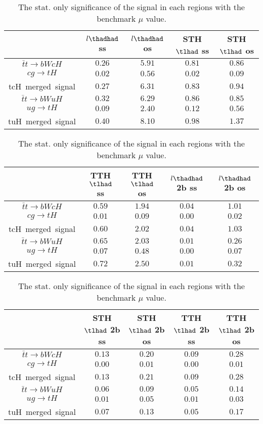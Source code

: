 \begin{table}
\footnotesize
\caption{The stat. only significance of the signal in each regions with the benchmark $\mu$ value.}
\centering
\begin{tabular}{|c|c|c|c|c|} \hline
 & $l\thadhad$ ss & $l\thadhad$ os & STH $\tlhad$ ss & STH $\tlhad$ os\\\hline
$\bar{t}t\to bWcH$ & $0.26$ & $5.91$ & $0.81$ & $0.86$\\\hline
$cg\to tH$ & $0.02$ & $0.56$ & $0.02$ & $0.09$\\\hline
tcH~merged~signal & $0.27$ & $6.31$ & $0.83$ & $0.94$\\\hline
$\bar{t}t\to bWuH$ & $0.32$ & $6.29$ & $0.86$ & $0.85$\\\hline
$ug\to tH$ & $0.09$ & $2.40$ & $0.12$ & $0.56$\\\hline
tuH~merged~signal & $0.40$ & $8.10$ & $0.98$ & $1.37$\\\hline
\end{tabular}
\begin{tabular}{|c|c|c|c|c|} \hline
 & TTH $\tlhad$ ss & TTH $\tlhad$ os & $l\thadhad$ 2b ss & $l\thadhad$ 2b os\\\hline
$\bar{t}t\to bWcH$ & $0.59$ & $1.94$ & $0.04$ & $1.01$\\\hline
$cg\to tH$ & $0.01$ & $0.09$ & $0.00$ & $0.02$\\\hline
tcH~merged~signal & $0.60$ & $2.02$ & $0.04$ & $1.03$\\\hline
$\bar{t}t\to bWuH$ & $0.65$ & $2.03$ & $0.01$ & $0.26$\\\hline
$ug\to tH$ & $0.07$ & $0.48$ & $0.00$ & $0.07$\\\hline
tuH~merged~signal & $0.72$ & $2.50$ & $0.01$ & $0.32$\\\hline
\end{tabular}
\begin{tabular}{|c|c|c|c|c|} \hline
 & STH $\tlhad$ 2b ss & STH $\tlhad$ 2b os & TTH $\tlhad$ 2b ss & TTH $\tlhad$ 2b os\\\hline
$\bar{t}t\to bWcH$ & $0.13$ & $0.20$ & $0.09$ & $0.28$\\\hline
$cg\to tH$ & $0.00$ & $0.01$ & $0.00$ & $0.01$\\\hline
tcH~merged~signal & $0.13$ & $0.21$ & $0.09$ & $0.28$\\\hline
$\bar{t}t\to bWuH$ & $0.06$ & $0.09$ & $0.05$ & $0.14$\\\hline
$ug\to tH$ & $0.01$ & $0.05$ & $0.01$ & $0.03$\\\hline
tuH~merged~signal & $0.07$ & $0.13$ & $0.05$ & $0.17$\\\hline
\end{tabular}
\label{tab:significance}
\end{table}
